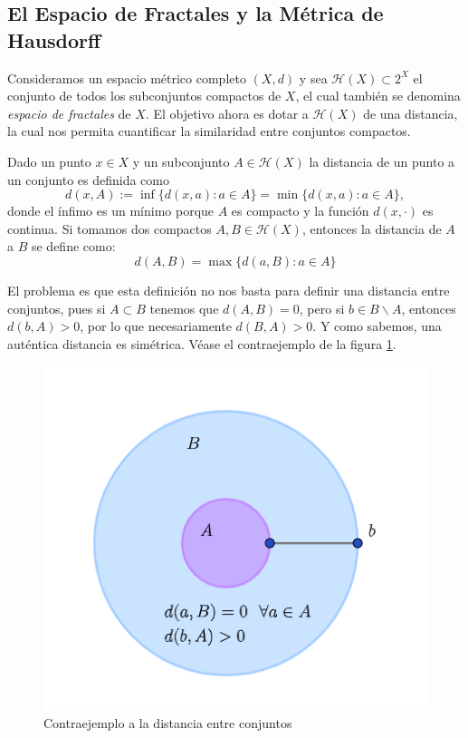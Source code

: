 \subsection{El Espacio de Fractales y la Métrica de Hausdorff}

Consideramos un espacio métrico completo $(X,d)$ y sea $\mathcal{H}(X)\subset 2^X$ el conjunto de todos los subconjuntos compactos de $X$, el cual también se denomina \textit{espacio de fractales} de $X$. El objetivo ahora es dotar a $\mathcal{H}(X)$ de una distancia, la cual nos permita cuantificar la similaridad entre conjuntos compactos. 

Dado un punto $x\in X$ y un subconjunto $A\in\mathcal H(X)$ la distancia de un punto a un conjunto es definida como
$$
d(x,A) := \inf\{d(x,a):a\in A\}=\min\{d(x,a):a\in A\},
$$
donde el ínfimo es un mínimo porque $A$ es compacto y la función $d(x,\cdot)$ es continua. Si tomamos dos compactos $A,B\in\mathcal H(X)$, entonces la distancia de $A$ a $B$ se define como:
$$
d(A,B)=\max\{d(a,B):a\in A\}
$$

El problema es que esta definición no nos basta para definir una distancia entre conjuntos, pues si $A\subset B$ tenemos que $d(A,B)=0$, pero si $b\in B\backslash A$, entonces $d(b,A)>0$, por lo que necesariamente $d(B,A)>0$. Y como sabemos, una auténtica distancia es simétrica. Véase el contraejemplo de la figura \ref{fig:contraejemplo-distancia}. 
\begin{figure} [ht]
    \centering
    \includegraphics[scale = 0.4]{img/C4/no-distancia-hausdorff.png}
    \caption{Contraejemplo a la distancia entre conjuntos}
        \label{fig:contraejemplo-distancia}
\end{figure}

